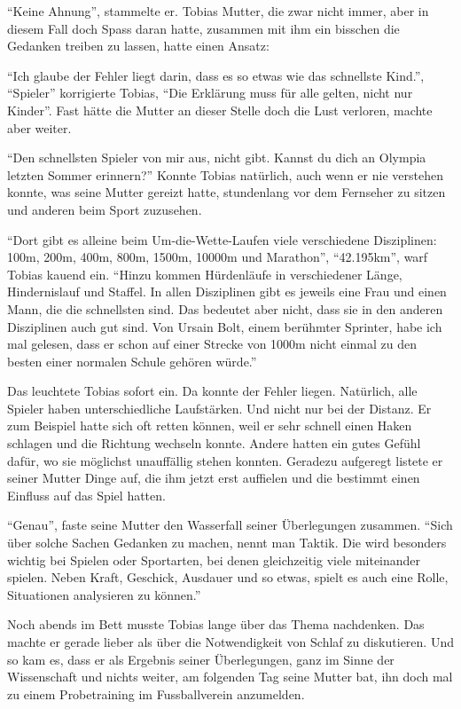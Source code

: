 \enquote{Keine Ahnung}, stammelte er. Tobias Mutter, die zwar nicht immer, aber in diesem Fall doch Spass daran hatte, zusammen mit ihm ein bisschen die Gedanken treiben zu lassen, hatte einen Ansatz:

\enquote{Ich glaube der Fehler liegt darin, dass es so etwas wie das schnellste Kind.}, \enquote{Spieler} korrigierte Tobias, \enquote{Die Erklärung muss für alle gelten, nicht nur Kinder}. Fast hätte die Mutter an dieser Stelle doch die Lust verloren, machte aber weiter.

\enquote{Den schnellsten Spieler von mir aus, nicht gibt. Kannst du dich an Olympia letzten Sommer erinnern?} Konnte Tobias natürlich, auch wenn er nie verstehen konnte, was seine Mutter gereizt hatte, stundenlang vor dem Fernseher zu sitzen und anderen beim Sport zuzusehen.


\enquote{Dort gibt es alleine beim Um-die-Wette-Laufen viele verschiedene Disziplinen: 100m, 200m, 400m, 800m, 1500m, 10000m und Marathon}, \enquote{42.195km}, warf Tobias kauend ein. \enquote{Hinzu kommen Hürdenläufe in verschiedener Länge, Hindernislauf und Staffel. In allen Disziplinen gibt es jeweils eine Frau und einen Mann, die die schnellsten sind. Das bedeutet aber nicht, dass sie in den anderen Disziplinen auch gut sind. Von Ursain Bolt, einem berühmter Sprinter, habe ich mal gelesen, dass er schon auf einer Strecke von 1000m nicht einmal zu den besten einer normalen Schule gehören würde.}

Das leuchtete Tobias sofort ein. Da konnte der Fehler liegen. Natürlich, alle Spieler haben unterschiedliche Laufstärken. Und nicht nur bei der Distanz. Er zum Beispiel hatte sich oft retten können, weil er sehr schnell einen Haken schlagen und die Richtung wechseln konnte. Andere hatten ein gutes Gefühl dafür, wo sie möglichst unauffällig stehen konnten. Geradezu aufgeregt listete er seiner Mutter Dinge auf, die ihm jetzt erst auffielen und die bestimmt einen Einfluss auf das Spiel hatten.

\enquote{Genau}, faste seine Mutter den Wasserfall seiner Überlegungen zusammen. \enquote{Sich über solche Sachen Gedanken zu machen, nennt man Taktik. Die wird besonders wichtig bei Spielen oder Sportarten, bei denen gleichzeitig viele miteinander spielen. Neben Kraft, Geschick, Ausdauer und so etwas, spielt es auch eine Rolle, Situationen analysieren zu können.}

Noch abends im Bett musste Tobias lange über das Thema nachdenken. Das machte er gerade lieber als über die Notwendigkeit von Schlaf zu diskutieren. Und so kam es, dass er als Ergebnis seiner Überlegungen, ganz im Sinne der Wissenschaft und nichts weiter, am folgenden Tag seine Mutter bat, ihn doch mal zu einem Probetraining im Fussballverein anzumelden.\hfill {}
\newpage
 

 
